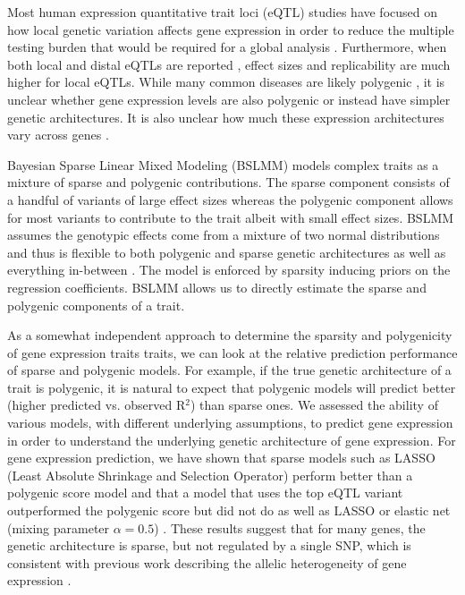 \documentclass[10pt,letterpaper]{article}
\begin{document}
Most human expression quantitative trait loci (eQTL) studies have focused on how local genetic variation affects gene expression in order to reduce the multiple testing burden that would be required for a global analysis \cite{Albert_2015, Stranger_2012}. Furthermore, when both local and distal eQTLs are reported \cite{Stranger_2007,Innocenti_2011,Wright_2014}, effect sizes and replicability are much higher for local eQTLs. While many common diseases are likely polygenic \cite{Purcell_2009,Stahl_2012,Morris_2012}, it is unclear whether gene expression levels are also polygenic or instead have simpler genetic architectures. It is also unclear how much these expression architectures vary across genes \cite{Albert_2015}. 

Bayesian Sparse Linear Mixed Modeling (BSLMM) models complex traits as a mixture of sparse and polygenic contributions. The sparse component consists of a handful of variants of large effect sizes whereas the polygenic component allows for most variants to contribute to the trait albeit with small effect sizes. BSLMM assumes the genotypic effects come from a mixture of two normal distributions and thus is flexible to both polygenic and sparse genetic architectures as well as everything in-between \cite{Zhou_2013}. The model is enforced by sparsity inducing priors on the
regression coefficients. BSLMM allows us to directly estimate the sparse and polygenic components of a trait.

As a somewhat independent approach to determine the sparsity and polygenicity of gene expression traits traits, we can look at the relative prediction performance of sparse and polygenic models. For example, if the true genetic architecture of a trait is polygenic, it is natural to expect that polygenic models will predict better (higher predicted vs. observed R$^2$) than sparse ones. We assessed the ability of various models, with different underlying assumptions, to predict gene expression in order to understand the underlying genetic architecture of gene expression. For gene expression prediction, we have shown that sparse models such as LASSO (Least Absolute Shrinkage and Selection Operator) perform better than a polygenic score model and that a model that uses the top eQTL variant outperformed the polygenic score but did not do as well as LASSO or elastic net (mixing parameter $\alpha=0.5$) \cite{Gamazon_2015}. These results suggest that for many genes, the genetic architecture is sparse, but not regulated by a single SNP, which is consistent with previous work describing the allelic heterogeneity of gene expression \cite{brown2013integrative,king2014genetic,zhang2011genetic}. 
\end{document}

